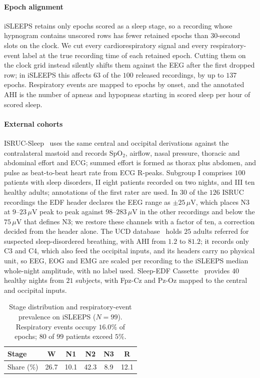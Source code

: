 \documentclass{ieeeaccess}
\begin{document}
\paragraph{Epoch alignment} iSLEEPS retains only epochs scored as a sleep stage, so a recording
whose hypnogram contains unscored rows has fewer retained epochs than $30$-second slots on the
clock. We cut every cardiorespiratory signal and every respiratory-event label at the true
recording time of each retained epoch. Cutting them on the clock grid instead silently shifts
them against the EEG after the first dropped row; in iSLEEPS this affects $63$ of the $100$
released recordings, by up to $137$ epochs. Respiratory events are mapped to epochs by onset, and the
annotated AHI is the number of apneas and hypopneas starting in scored sleep per hour of scored
sleep.

\paragraph{External cohorts} ISRUC-Sleep~\cite{khalighi2016isruc} uses the same central and
occipital derivations against the contralateral mastoid and records SpO$_2$, airflow, nasal
pressure, thoracic and abdominal effort and ECG; summed effort is formed as thorax plus abdomen,
and pulse as beat-to-beat heart rate from ECG R-peaks. Subgroup I comprises $100$ patients with
sleep disorders, II eight patients recorded on two nights, and III ten healthy adults; annotations
of the first rater are used. In $30$ of the $126$ ISRUC recordings the EDF header declares the
EEG range as $\pm25\,\mu$V, which places N3 at $9$--$23\,\mu$V peak to peak against $98$--$283\,\mu$V
in the other recordings and below the $75\,\mu$V that defines N3; we restore these channels
with a factor of ten, a correction decided from the header alone. The UCD database~\cite{ucddb2007}
holds $25$ adults referred for suspected sleep-disordered breathing, with AHI from $1.2$ to
$81.2$; it records only C3 and C4, which also feed the occipital inputs, and its headers carry no
physical unit, so EEG, EOG and EMG are scaled per recording to the iSLEEPS median whole-night
amplitude, with no label used. Sleep-EDF Cassette~\cite{kemp2000sleepedf} provides $40$ healthy
nights from $21$ subjects, with Fpz-Cz and Pz-Oz mapped to the central and occipital inputs.

\begin{table}[t]
\caption{Stage distribution and respiratory-event prevalence on iSLEEPS ($N=99$). Respiratory
events occupy $16.0\%$ of epochs; $80$ of $99$ patients exceed $5\%$.}
\label{tab:dist}
\centering
\begin{tabular}{lccccc}
\toprule
Stage & W & N1 & N2 & N3 & R \\
\midrule
Share (\%) & 26.7 & 10.1 & 42.3 & 8.9 & 12.1 \\
\bottomrule
\end{tabular}
\end{table}
\end{document}
